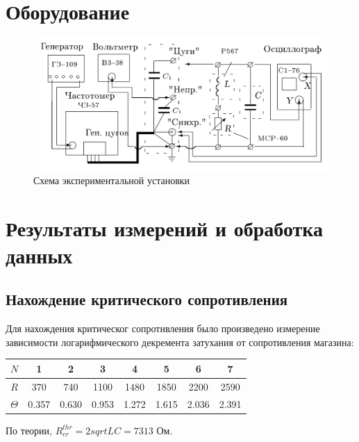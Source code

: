 \documentclass{lab}
\begin{document}
\section{Оборудование}
\begin{figure}[h!]
    \centering
    \includegraphics[width=1\linewidth]{Screenshot_2}
    \caption{Схема экспериментальной установки}
    \label{fig:set}
\end{figure}

\section{Результаты измерений и обработка данных}

\subsection {Нахождение критического сопротивления}

Для нахождения критическог сопротивления было произведено измерение зависимости логарифмического декремента затухания от сопротивления магазина:

\begin{table}[h!]
    \begin{center}
        \begin{tabular}{|c|c|c|c|c|c|c|c|}
            \hline
            $N$       & 1       & 2       & 3     & 4     & 5     & 6     & 7     \\ \hline
            $R$       & 370     & 740     & 1100  & 1480  & 1850  & 2200  & 2590  \\ \hline
            $\Theta$  & 0.357   & 0.630   & 0.953 & 1.272 & 1.615 & 2.036 & 2.391 \\ \hline
        \end{tabular}
    \end{center}
\end{table}

По теории, $R_{cr}^{thr} = 2 sqrt{L}{C} = 7313$ Ом.
\end{document}

